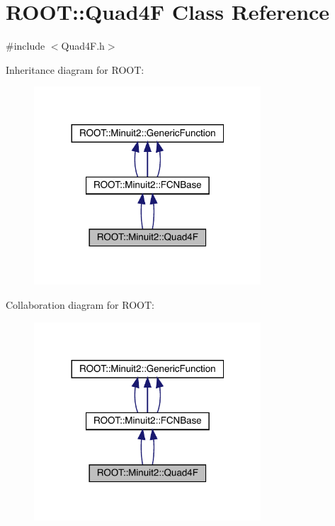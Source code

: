\hypertarget{classROOT_1_1Minuit2_1_1Quad4F}{}\section{R\+O\+OT\+:\+:Quad4F Class Reference}
\label{classROOT_1_1Minuit2_1_1Quad4F}


{\ttfamily \#include $<$Quad4\+F.\+h$>$}



Inheritance diagram for R\+O\+OT\+:
\nopagebreak
\begin{figure}[H]
\begin{center}
\leavevmode
\includegraphics[width=240pt]{da/d05/classROOT_1_1Minuit2_1_1Quad4F__inherit__graph}
\end{center}
\end{figure}


Collaboration diagram for R\+O\+OT\+:
\nopagebreak
\begin{figure}[H]
\begin{center}
\leavevmode
\includegraphics[width=240pt]{d6/d95/classROOT_1_1Minuit2_1_1Quad4F__coll__graph}
\end{center}
\end{figure}
